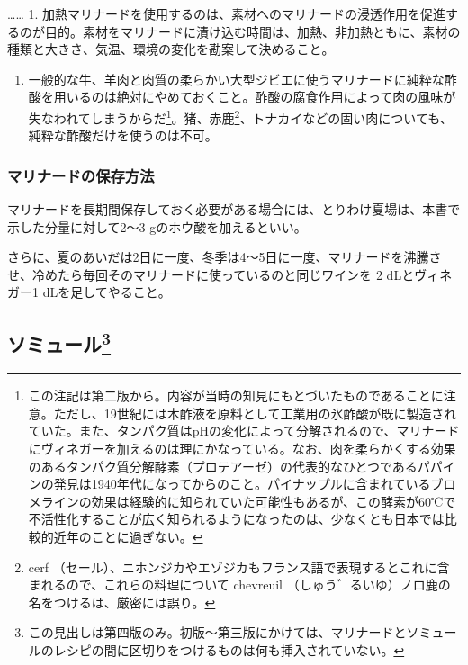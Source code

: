 \begin{recette}
\ldots{}\ldots{} 1.
加熱マリナードを使用するのは、素材へのマリナードの浸透作用を促進するのが目的。素材をマリナードに漬け込む時間は、加熱、非加熱ともに、素材の種類と大きさ、気温、環境の変化を勘案して決めること。

\begin{enumerate}
\def\labelenumi{\arabic{enumi}.}
\setcounter{enumi}{1}
\tightlist
\item
  一般的な牛、羊肉と肉質の柔らかい大型ジビエに使うマリナードに純粋な酢酸を用いるのは絶対にやめておくこと。酢酸の腐食作用によって肉の風味が失なわれてしまうからだ\footnote{この注記は第二版から。内容が当時の知見にもとづいたものであることに注意。ただし、19世紀には木酢液を原料として工業用の氷酢酸が既に製造されていた。また、タンパク質はpHの変化によって分解されるので、マリナードにヴィネガーを加えるのは理にかなっている。なお、肉を柔らかくする効果のあるタンパク質分解酵素（プロテアーゼ）の代表的なひとつであるパパインの発見は1940年代になってからのこと。パイナップルに含まれているブロメラインの効果は経験的に知られていた可能性もあるが、この酵素が60℃で不活性化することが広く知られるようになったのは、少なくとも日本では比較的近年のことに過ぎない。}。猪、赤鹿\footnote{cerf
    （セール）、ニホンジカやエゾジカもフランス語で表現するとこれに含まれるので、これらの料理について
    chevreuil （しゅう゛るいゆ）ノロ鹿の名をつけるは、厳密には誤り。}、トナカイなどの固い肉についても、純粋な酢酸だけを使うのは不可。
\end{enumerate}

\hypertarget{conservation-des-marinades}{%
\subsubsection{マリナードの保存方法}\label{conservation-des-marinades}}



マリナードを長期間保存しておく必要がある場合には、とりわけ夏場は、本書で示した分量に対して2〜3
gのホウ酸を加えるといい。

さらに、夏のあいだは2日に一度、冬季は4〜5日に一度、マリナードを沸騰させ、冷めたら毎回そのマリナードに使っているのと同じワインを
2 dLとヴィネガー1 dLを足してやること。
\end{recette}
\hypertarget{saumures}{%
\subsection[ソミュール]{\texorpdfstring{ソミュール\footnote{この見出しは第四版のみ。初版〜第三版にかけては、マリナードとソミュールのレシピの間に区切りをつけるものは何も挿入されていない。}}{ソミュール}}\label{saumures}}

